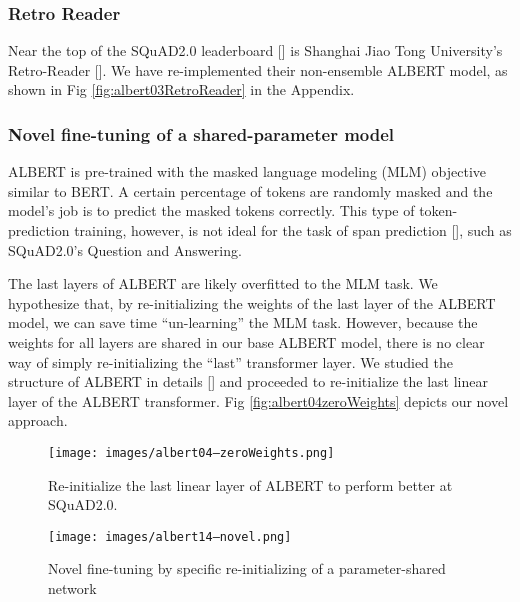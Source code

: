 \documentclass{article}
\begin{document}
\subsubsection{Retro Reader}
Near the top of the SQuAD2.0 leaderboard [] is Shanghai Jiao Tong University’s Retro-Reader [].  We have re-implemented their non-ensemble ALBERT model, as shown in Fig \ref{fig:albert03RetroReader} in the Appendix.


\subsubsection{Novel fine-tuning of a shared-parameter model}
ALBERT is pre-trained with the masked language modeling (MLM) objective similar to BERT.  A certain percentage of tokens are randomly masked and the model’s job is to predict the masked tokens correctly.  This type of token-prediction training, however, is not ideal for the task of span prediction [], such as SQuAD2.0’s Question and Answering.

The last layers of ALBERT are likely overfitted to the MLM task.  We hypothesize that, by re-initializing the weights of the last layer of the ALBERT model, we can save time “un-learning” the MLM task.  However, because the weights for all layers are shared in our base ALBERT model, there is no clear way of simply re-initializing the “last” transformer layer.  We studied the structure of ALBERT in details [] and proceeded to re-initialize the last linear layer of the ALBERT transformer.  Fig \ref{fig:albert04zeroWeights} depicts our novel approach.


\begin{figure}[h]
    \centering
    \begin{minipage}{0.45\textwidth}
        \centering
        \texttt{[image: images/albert04--zeroWeights.png]}
        \caption{Re-initialize the last linear layer of ALBERT to perform better at SQuAD2.0.}
        \label{fig:albert04zeroWeights}
    \end{minipage}\hfill
    \begin{minipage}{0.45\textwidth}
        \centering
        \texttt{[image: images/albert14--novel.png]}
        \caption{Novel fine-tuning by specific re-initializing of a parameter-shared network}
        \label{fig:albert14novel}
    \end{minipage}
\end{figure}
\end{document}
